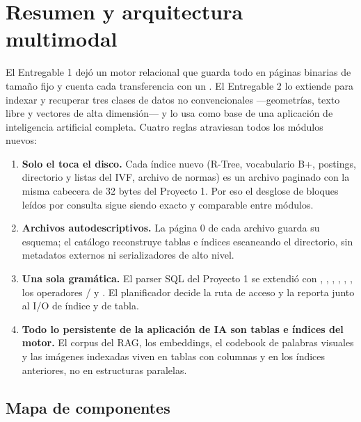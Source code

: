 \section{Resumen y arquitectura multimodal}

El Entregable 1 dejó un motor relacional que guarda todo en páginas binarias de
tamaño fijo y cuenta cada transferencia con un . El Entregable 2 lo
extiende para indexar y recuperar tres clases de datos no convencionales
---geometrías, texto libre y vectores de alta dimensión--- y lo usa como base de una
aplicación de inteligencia artificial completa. Cuatro reglas atraviesan todos los
módulos nuevos:

\begin{enumerate}[nosep]
  \item \textbf{Solo el  toca el disco.} Cada índice nuevo (R-Tree,
        vocabulario B+, postings, directorio y listas del IVF, archivo de normas) es un
        archivo paginado con la misma cabecera de 32 bytes del Proyecto 1. Por eso el
        desglose de bloques leídos por consulta sigue siendo exacto y comparable entre
        módulos.
  \item \textbf{Archivos autodescriptivos.} La página 0 de cada archivo guarda su
        esquema; el catálogo reconstruye tablas e índices escaneando el directorio, sin
        metadatos externos ni serializadores de alto nivel.
  \item \textbf{Una sola gramática.} El parser SQL del Proyecto 1 se extendió con
        , , ,
        , , , los operadores \code{<->} /
        \code{<=>} y . El planificador decide la ruta de acceso y la
        reporta junto al I/O de índice y de tabla.
  \item \textbf{Todo lo persistente de la aplicación de IA son tablas e índices del
        motor.} El corpus del RAG, los embeddings, el codebook de palabras visuales y
        las imágenes indexadas viven en tablas  con columnas
         y en los índices anteriores, no en estructuras paralelas.
\end{enumerate}

\subsection{Mapa de componentes}

